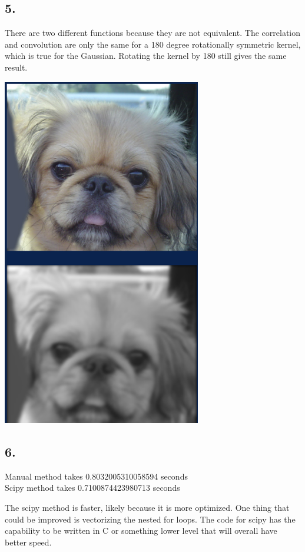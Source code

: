\documentclass[12pt]{article}
\begin{document}
\subsection*{5.}
There are two different functions because they are not equivalent. The correlation and convolution are only the same for a 180 degree rotationally symmetric kernel, which is true for the Gaussian. Rotating the kernel by 180 still gives the same result.

\includegraphics[width=0.65\textwidth]{imgs/5-c.png}

\subsection*{6.}
Manual method takes 0.8032005310058594 seconds\\
Scipy method takes 0.7100874423980713 seconds

The scipy method is faster, likely because it is more optimized. One thing that could be improved is vectorizing the nested for loops. The code for scipy has the capability to be written in C or something lower level that will overall have better speed.
\end{document}
